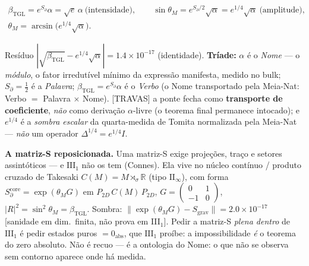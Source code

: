 \documentclass[11pt]{article}
\newcommand{\bTGL}{\beta_{\mathrm{TGL}}}\newcommand{\Msun}{M_{\odot}}\newcommand{\TGL}{\mathrm{TGL}}
\theoremstyle{definition}\newtheorem{deriv}{Derivação}
\begin{document}
\begin{equation}\begin{gathered}\bTGL=e^{S_\partial}\alpha=\sqrt e\,\alpha\ \text{(intensidade)},\qquad \sin\theta_M=e^{S_\partial/2}\sqrt\alpha=e^{1/4}\sqrt\alpha\ \text{(amplitude)},\\ \theta_M=\arcsin\!\big(e^{1/4}\sqrt\alpha\big).\end{gathered}\end{equation}

Resíduo $|\sqrt{\bTGL}-e^{1/4}\sqrt\alpha|=1.4\times10^{-17}$ (identidade). \textbf{Tríade:} $\alpha$ é o \emph{Nome} --- o \emph{módulo}, o fator irredutível mínimo da expressão manifesta, medido no bulk; $S_\partial=\tfrac12$ é a \emph{Palavra}; $\bTGL=e^{S_\partial}\alpha$ é o \emph{Verbo} (o Nome transportado pela Meia-Nat: Verbo $=$ Palavra $\times$ Nome). \textsf{[TRAVAS]} a ponte fecha como \textbf{transporte de coeficiente}, \emph{não} como derivação $\alpha$-livre (o teorema final permanece intocado); e $e^{1/4}$ é a \emph{sombra escalar} da quarta-medida de Tomita normalizada pela Meia-Nat --- \emph{não} um operador $\Delta^{1/4}=e^{1/4}I$.

\textbf{A matriz-S reposicionada.} Uma matriz-S exige projeções, traço e setores assintóticos --- e $\mathrm{III}_1$ não os tem (Connes). Ela vive no núcleo contínuo / produto cruzado de Takesaki $C(M)=M\rtimes_\sigma\mathbb R$ (tipo $\mathrm{II}_\infty$), com forma $S_\partial^{\mathrm{core}}=\exp(\theta_M G)$ em $P_{2D}\,C(M)\,P_{2D}$, $G=\left(\begin{smallmatrix}0&1\\-1&0\end{smallmatrix}\right)$, $|R|^2=\sin^2\theta_M=\bTGL$. Sombra: $\|\exp(\theta_M G)-S_{\mathrm{grav}}\|=2.0\times10^{-17}$ \textsf{[sanidade em dim.\ finita, não prova em III$_1$]}. Pedir a matriz-S \emph{plena dentro} de $\mathrm{III}_1$ é pedir estados puros $=0_{\mathrm{abs}}$, que $\mathrm{III}_1$ proíbe: a impossibilidade \emph{é} o teorema do zero absoluto. Não é recuo --- é a ontologia do Nome: o que não se observa sem contorno aparece onde há medida.
\end{document}
